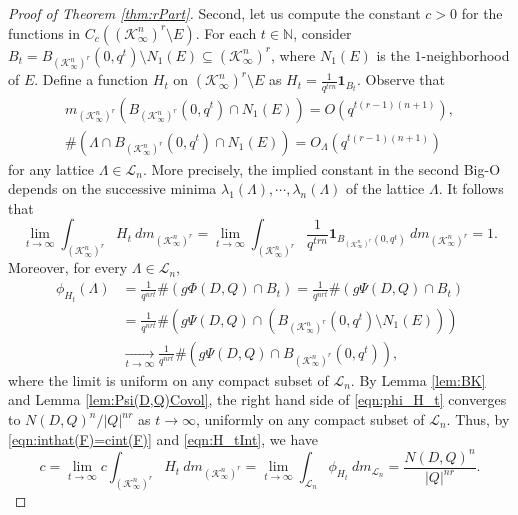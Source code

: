\documentclass[11pt,a4paper,reqno]{amsart}
\theoremstyle{definition}
\theoremstyle{remark}
\numberwithin{equation}{section}
\begin{document}
\begin{proof}[Proof of Theorem \ref{thm:rPart}]
    \vspace{0.1in}
    Second, let us compute the constant $c>0$ for the functions in $C_c\left((\mathcal K^n_\infty)^r\setminus E\right)$. For each $t\in \mathbb N$, consider $B_t=B_{(\mathcal{K}_{\infty}^n)^r}(0,q^t)\setminus N_{1}(E)\subseteq (\mathcal{K}_{\infty}^n)^r$, where $N_{1}(E)$ is the $1$-neighborhood of $E$. 
    Define a function $H_t$ on $(\mathcal K^n_\infty)^r\setminus E$ as 
    $H_t=\frac 1 {q^{trn}} \mathbf 1_{B_t}.$
    Observe that
    \[\begin{gathered}
    m_{(\mathcal K_\infty^n)^r} \left(B_{(\mathcal{K}_{\infty}^n)^r}(0,q^t)\cap  N_{1}(E)\right)=O\left(q^{t(r-1)(n+1)}\right),\\
    \#\left(\Lambda\cap B_{(\mathcal{K}_{\infty}^n)^r}(0,q^t)\cap  N_{1}(E)\right)=O_\Lambda\left(q^{t(r-1)(n+1)}\right)
    \end{gathered}\] 
    for any lattice $\Lambda\in \mathcal{L}_n$. More precisely, the implied constant in the second Big-O depends on the successive minima $\lambda_1(\Lambda),\cdots ,\lambda_n(\Lambda)$ of the lattice $\Lambda$.
    It follows that
    \begin{equation}\label{eqn:H_tInt}
    \lim_{t\rightarrow \infty}\int_{(\mathcal{K}_{\infty}^n)^r} H_t\:dm_{(\mathcal{K}_{\infty}^n)^r} =\lim_{t\rightarrow \infty}\int_{(\mathcal{K}_{\infty}^n)^r}\frac 1 {q^{trn}}\mathbf 1_{B_{(\mathcal{K}_{\infty}^n)^r}(0,q^t)}\:dm_{(\mathcal{K}_{\infty}^n)^r}=1.\end{equation}
    Moreover, for every $\Lambda \in \mathcal{L}_n$,
    \begin{equation}\label{eqn:phi_H_t}\begin{split}
    \phi_{H_t}(\Lambda)
    &=\frac 1 {q^{nrt}} \#\left(g\Phi(D,Q)\cap B_t\right)
    =\frac 1 {q^{nrt}} \#\left(g\Psi(D,Q)\cap B_t\right)\\
    &=\frac 1 {q^{nrt}} \#\left(g\Psi(D,Q) \cap (B_{(\mathcal K_\infty^n)^r}(0, q^t)\setminus N_{1}(E))\right)\\
    &\underset{t\rightarrow \infty}{\longrightarrow} \frac 1 {q^{nrt}} \#(g\Psi(D,Q)\cap B_{(\mathcal K_\infty^n)^r}(0, q^t)),
    \end{split}\end{equation}
    where the limit is uniform on any compact subset of $\mathcal L_n$. By Lemma \ref{lem:BK} and Lemma \ref{lem:Psi(D,Q)Covol}, the right hand side of \eqref{eqn:phi_H_t} converges to $N(D,Q)^n/|Q|^{nr}$ as $t\rightarrow \infty$, uniformly on any compact subset of $\mathcal L_n$.
    Thus, by \eqref{eqn:inthat(F)=cint(F)} and \eqref{eqn:H_tInt}, we have
    \[
    c=\lim_{t\rightarrow \infty} c\int_{\left(\mathcal{K}_{\infty}^n\right)^r} H_t\: dm_{\left(\mathcal{K}_{\infty}^n\right)^r}=\lim_{t\rightarrow \infty} \int_{\mathcal L_n} \phi_{H_t}\: dm_{\mathcal L_n}=\frac {N(D,Q)^n} {|Q|^{nr}}.
    \]


\end{proof}
\end{document}
